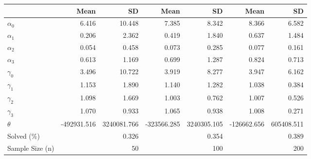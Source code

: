 
\begin{tabular}[t]{lrrrrrr}
\toprule
  & Mean & SD & Mean  & SD  & Mean   & SD  \\
\midrule
$\alpha_{0}$ & 6.416 & 10.448 & 7.385 & 8.342 & 8.366 & 6.582\\
$\alpha_{1}$ & 0.206 & 2.362 & 0.419 & 1.840 & 0.637 & 1.484\\
$\alpha_{2}$ & 0.054 & 0.458 & 0.073 & 0.285 & 0.077 & 0.161\\
$\alpha_{3}$ & 0.613 & 1.169 & 0.699 & 1.287 & 0.824 & 0.713\\
$\gamma_{0}$ & 3.496 & 10.722 & 3.919 & 8.277 & 3.947 & 6.162\\
$\gamma_{1}$ & 1.153 & 1.890 & 1.140 & 1.282 & 1.038 & 0.384\\
$\gamma_{2}$ & 1.098 & 1.669 & 1.003 & 0.762 & 1.007 & 0.526\\
$\gamma_{3}$ & 1.070 & 0.933 & 1.065 & 0.938 & 1.008 & 0.271\\
$\theta$ & -492931.516 & 3240081.766 & -323566.285 & 3240305.105 & -126662.656 & 605408.511\\
Solved (\%) &  & 0.326 &  & 0.354 &  & 0.389\\
Sample Size (n) &  & 50 &  & 100 &  & 200\\
\bottomrule
\end{tabular}
